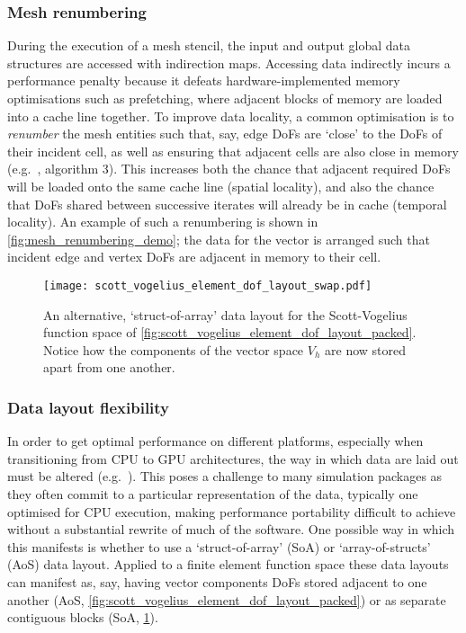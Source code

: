 \documentclass[thesis]{subfiles}
\begin{document}
\subsubsection{Mesh renumbering}
\label{sec:intro_mesh_numbering}

During the execution of a mesh stencil, the input and output global data structures are accessed with indirection maps.
Accessing data indirectly incurs a performance penalty because it defeats hardware-implemented memory optimisations such as prefetching, where adjacent blocks of memory are loaded into a cache line together.
To improve data locality, a common optimisation is to \emph{renumber} the mesh entities such that, say, edge DoFs are `close' to the DoFs of their incident cell, as well as ensuring that adjacent cells are also close in memory (e.g.~\cite{langeEfficientMeshManagement2016}, algorithm 3).
This increases both the chance that adjacent required DoFs will be loaded onto the same cache line (spatial locality), and also the chance that DoFs shared between successive iterates will already be in cache (temporal locality).
An example of such a renumbering is shown in \cref{fig:mesh_renumbering_demo}; the data for the vector is arranged such that incident edge and vertex DoFs are adjacent in memory to their cell.

\begin{figure}
  \centering
  \texttt{[image: scott\_vogelius\_element\_dof\_layout\_swap.pdf]}
  \caption{
    An alternative, `struct-of-array' data layout for the Scott-Vogelius function space of \cref{fig:scott_vogelius_element_dof_layout_packed}.
    Notice how the components of the vector space $V_h$ are now stored apart from one another.
  }
  \label{fig:scott_vogelius_element_dof_layout_swap}
\end{figure}

\subsubsection{Data layout flexibility}
\label{sec:intro_data_layout_flex}

In order to get optimal performance on different platforms, especially when transitioning from CPU to GPU architectures, the way in which data are laid out must be altered (e.g.~\cite{markallFiniteElementAssembly2013,sulyokLocalityOptimizedUnstructured2019}).
This poses a challenge to many simulation packages as they often commit to a particular representation of the data, typically one optimised for CPU execution, making performance portability difficult to achieve without a substantial rewrite of much of the software.
One possible way in which this manifests is whether to use a `struct-of-array' (SoA) or `array-of-structs' (AoS) data layout.
Applied to a finite element function space these data layouts can manifest as, say, having vector components DoFs stored adjacent to one another (AoS, \cref{fig:scott_vogelius_element_dof_layout_packed}) or as separate contiguous blocks (SoA, \cref{fig:scott_vogelius_element_dof_layout_swap}).
\end{document}
